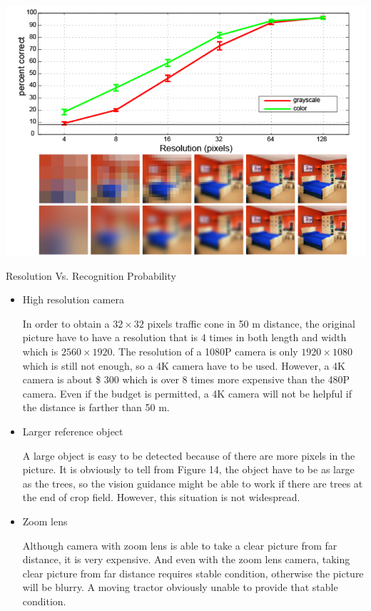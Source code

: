 \documentclass[12pt]{article}
\begin{document}
\begin{flushleft}
\begin{table}[ht!]
\begin{center}
		\includegraphics[scale = 0.6]{pixel.png}
		\caption{Resolution Vs. Recognition Probability}
	\end{center}
\end{table}

\begin{itemize}
	\item High resolution camera
	
	In order to obtain a $32\times32$ pixels traffic cone in 50 m distance, the original picture have to have a resolution that is 4 times in both length and width which is $2560\times1920$. The resolution of a 1080P camera is only $1920\times1080$ which is still not enough, so a 4K camera have to be used. However, a 4K camera is about \$ 300 which is over 8 times more expensive than the 480P camera. Even if the budget is permitted, a 4K camera will not be helpful if the distance is farther than 50 m.
	\item Larger reference object
	
	A large object is easy to be detected because of there are more pixels in the picture. It is obviously to tell from Figure 14, the object have to be as large as the trees, so the vision guidance might be able to work if there are trees at the end of crop field. However, this situation is not widespread.
	
	\item Zoom lens
	
	Although camera with zoom lens is able to take a clear picture from far distance, it is very expensive. And even with the zoom lens camera, taking clear picture from far distance requires stable condition, otherwise the picture will be blurry. A moving tractor obviously unable to provide that stable condition.


\end{itemize}
\end{flushleft}
\end{document}
